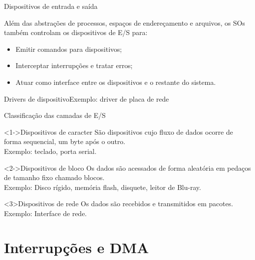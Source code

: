 \begin{frame}{Dispositivos de entrada e saída}

  Além das abstrações de processos, espaços de endereçamento e arquivos,
  os SOs também controlam os dispositivos de E/S para:

  \begin{itemize}
  \item Emitir comandos para dispositivos;
  \item Interceptar interrupções e tratar erros;
  \item Atuar como interface entre os dispositivos e o restante do sistema.
  \end{itemize}

\end{frame}

\begin{frame}{Drivers de dispositivo}{Exemplo: driver de placa de rede}
  \begin{center}  
    
  \end{center}
\end{frame}

\begin{frame}{Classificação das camadas de E/S}
  
  \begin{block}<1->{Dispositivos de caracter}
    São dispositivos cujo fluxo de dados ocorre de forma sequencial,
    um byte após o outro.\\
    \smallskip
    Exemplo: teclado, porta serial.
  \end{block}

  \begin{block}<2->{Dispositivos de bloco}
    Os dados são acessados de forma aleatória em pedaços de 
    tamanho fixo chamado blocos.\\
    \smallskip
    Exemplo: Disco rígido, memória flash, disquete, leitor de Blu-ray.    
  \end{block}

  \begin{block}<3>{Dispositivos de rede} Os dados são recebidos e
    transmitidos em pacotes. \\\smallskip
    Exemplo: Interface de rede. 
  \end{block}
  
\end{frame}

\part{Interrupções e DMA}
\frame{\partpage}


